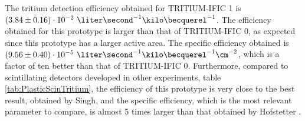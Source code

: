 The tritium detection efficiency obtained for TRITIUM-IFIC 1 is $(3.84 \pm 0.16)\cdot{} 10^{-2}~\liter\second^{-1}\kilo\becquerel^{-1}$. The efficiency obtained for this prototype is larger than that of TRITIUM-IFIC 0, as expected since this prototype has a larger active area. The specific efficiency obtained is $(9.56 \pm 0.40)\cdot{} 10^{-5}~\liter\second^{-1}\kilo\becquerel^{-1}\cm^{-2}$, which is a factor of ten better than that of TRITIUM-IFIC 0. Furthermore, compared to scintillating detectors developed in other experiments, table \ref{tab:PlasticScinTritium}, the efficiency of this prototype is very close to the best result, obtained by Singh, and the specific efficiency, which is the most relevant parameter to compare, is almost 5 times larger than that obtained by Hofstetter \cite{Hofstetter1, Hofstetter2}.

